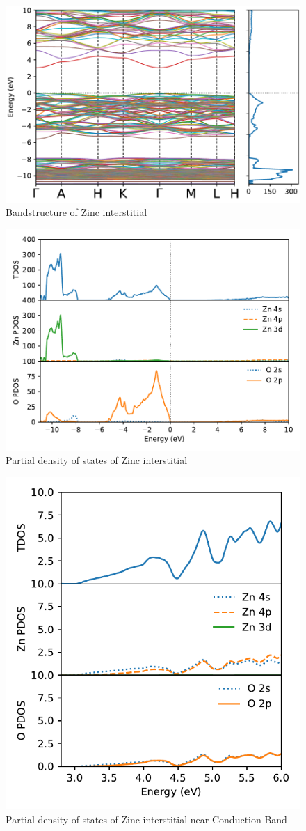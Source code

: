 \begin{figure}[tbh!]
	\centering
	\includegraphics[width=0.7\linewidth]{"images/rnd/band-dos_Zn_i"}
	\caption[Bandstructure of Zinc interstitial]{Bandstructure of Zinc interstitial}
\end{figure}

\begin{figure}[tbh!]
	\centering
	\includegraphics[width=0.7\linewidth]{"images/rnd/dos-pdos_Zn_i"}
	\caption[Partial density of states of Zinc interstitial]{Partial density of states of Zinc interstitial}
\end{figure}

\begin{figure}[tbh!]
	\centering
	\includegraphics[width=0.5\linewidth]{"images/rnd/dos-pdos-zoom_Zn_i"}
	\caption[Partial density of states of Zinc interstitial near Conduction Band]{Partial density of states of Zinc interstitial near Conduction Band}
\end{figure}

